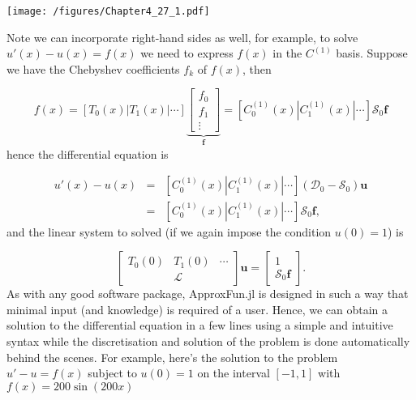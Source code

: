 \documentclass[12pt,a4paper]{article}
\begin{document}
\texttt{[image: /figures/Chapter4\_27\_1.pdf]}

Note we can incorporate right-hand sides as well, for example, to solve $u'(x) - u(x) = f(x)$ we need to express $f(x)$ in the $C^{(1)}$ basis.  Suppose we have the Chebyshev coefficients $f_k$ of $f(x)$, then

\[
f(x) = \left[ T_0(x) | T_1(x) | \cdots \right]\underbrace{\begin{bmatrix} f_0 \\
f_1 \\
 \vdots \end{bmatrix}}_{\mathbf{f}} =  \left[ C_0^{(1)}(x) | C_1^{(1)}(x) | \cdots \right]\mathcal{S}_0 \mathbf{f} 
\]
hence the differential equation is


\begin{eqnarray*}
u'(x)-u(x) &=&  \left[ C_0^{(1)}(x) | C_1^{(1)}(x) | \cdots \right]\left(\mathcal{D}_0 - \mathcal{S}_0\right)\mathbf{u}\\
 &=& \left[ C_0^{(1)}(x) | C_1^{(1)}(x) | \cdots \right]\mathcal{S}_0\mathbf{f},
\end{eqnarray*}
and the linear system to solved (if we again impose the condition $u(0) = 1$) is

\[
\begin{bmatrix}
T_0(0) & T_1(0) & \cdots  \\
 &\mathcal{L} &
\end{bmatrix}\mathbf{u} = \begin{bmatrix} 1 \\
\mathcal{S}_0\mathbf{f}
\end{bmatrix}.
\]
As with any good software package, ApproxFun.jl is designed in such a way that minimal input (and knowledge) is required of a user.  Hence, we can obtain a solution to the differential equation  in a few lines using a simple and intuitive syntax while the discretisation and solution of the problem is done automatically behind the scenes.  For example, here's the solution to the problem $u' - u = f(x)$ subject to $u(0) = 1$ on the interval $[-1, 1]$ with $f(x) = 200\sin(200x)$
\end{document}
